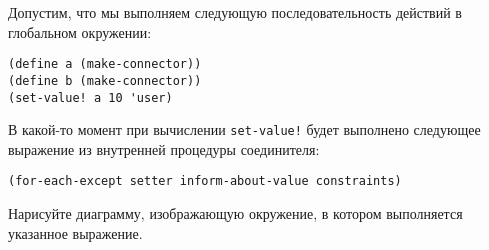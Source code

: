 \begin{exercise}{3.36}\label{EX3.36}%
Допустим, что мы выполняем следующую последовательность
действий в глобальном окружении:

\begin{Verbatim}[fontsize=\small]
(define a (make-connector))
(define b (make-connector))
(set-value! a 10 'user)
\end{Verbatim}
В какой-то момент при вычислении {\tt set-value!} будет
выполнено следующее выражение из внутренней процедуры соединителя:

\begin{Verbatim}[fontsize=\small]
(for-each-except setter inform-about-value constraints)
\end{Verbatim}
Нарисуйте диаграмму, изображающую окружение, в котором выполняется
указанное выражение.
\end{exercise}
